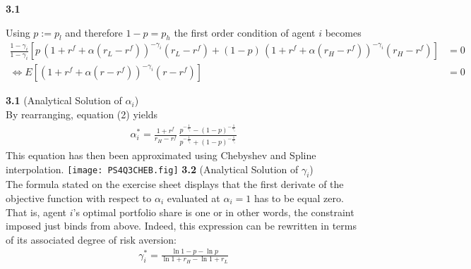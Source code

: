 \documentclass{article}
\begin{document}
\textbf{3.1}
	
Using $p:=p_l$ and therefore  $1-p=p_h$ the first order condition of agent $i$ becomes  \begin{align}\scriptstyle
\frac{1-\gamma_i}{1-\gamma_i} \left[p\, (1+r^f+\alpha(r_L-r^f))^{-\gamma_i}(r_L-r^f) +(1-p)\, (1+r^f+\alpha(r_H-r^f))^{-\gamma_i}(r_H-r^f)\right]&= 0 \\ \Leftrightarrow E\left[ (1+r^f+\alpha(r-r^f))^{-\gamma_i}(r-r^f)\right]&=0 
\end{align}

\textbf{3.1} (Analytical Solution of $\alpha_i$)\\
By rearranging, equation (2) yields 
\begin{align*}
\alpha_i^*=\frac{1+r^f}{r_H-r^f}\, \frac{p^{-\frac{1}{\gamma_i}}-(1-p)^{-\frac{1}{\gamma_i}}}{p^{-\frac{1}{\gamma_i}}+(1-p)^{-\frac{1}{\gamma_i}}}
\end{align*}
This equation has then been approximated using Chebyshev and Spline interpolation.
\texttt{[image: PS4Q3CHEB.fig]} 
\textbf{3.2} (Analytical Solution of $\gamma_i$)\\

The formula stated on the exercise sheet  displays that the first derivate of the objective function with respect to $\alpha_i$ evaluated at $\alpha_i=1$ has to be equal zero. That is, agent $i$'s optimal portfolio share is one or in other words, the constraint imposed just binds from above. Indeed, this expression can be rewritten in terms of its associated degree of risk aversion: \begin{align*}
\gamma_i^*=\frac{\ln{1-p}-\ln{p}}{\ln {1+r_H}-\ln {1+r_L}}
\end{align*}
\end{document}
